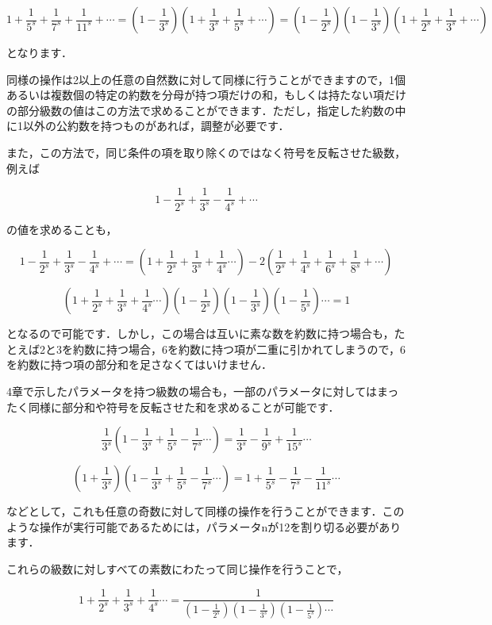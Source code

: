 \documentclass[./main]{subfiles}
\theoremstyle{break}
\begin{document}
\[1+\frac{1}{5^s}+\frac{1}{7^s}+\frac{1}{11^s}+\cdots=\left( 1-\frac{1}{3^s} \right)\left( 1+\frac{1}{3^s}+\frac{1}{5^s}+\cdots \right)=\left( 1-\frac{1}{2^s} \right)\left( 1-\frac{1}{3^s} \right)\left( 1+\frac{1}{2^s}+\frac{1}{3^s}+\cdots \right)\]

となります．

同様の操作は2以上の任意の自然数に対して同様に行うことができますので，1個あるいは複数個の特定の約数を分母が持つ項だけの和，もしくは持たない項だけの部分級数の値はこの方法で求めることができます．ただし，指定した約数の中に1以外の公約数を持つものがあれば，調整が必要です．

また，この方法で，同じ条件の項を取り除くのではなく符号を反転させた級数，例えば

\[1-\frac{1}{2^s}+\frac{1}{3^s}-\frac{1}{4^s}+\cdots\]

の値を求めることも，

\[1-\frac{1}{2^s}+\frac{1}{3^s}-\frac{1}{4^s}+\cdots= \left(1+\frac{1}{2^s}+\frac{1}{3^s}+\frac{1}{4^s}\cdots \right)-2\left(\frac{1}{2^s}+\frac{1}{4^s}+\frac{1}{6^s}+\frac{1}{8^s}+\cdots \right)\]

\[\left( 1+\frac{1}{2^s}+\frac{1}{3^s}+\frac{1}{4^s}\cdots \right)\left( 1-\frac{1}{2^s} \right)\left( 1-\frac{1}{3^s} \right)\left( 1-\frac{1}{5^s} \right)\cdots=1\]

となるので可能です．しかし，この場合は互いに素な数を約数に持つ場合も，たとえば2と3を約数に持つ場合，6を約数に持つ項が二重に引かれてしまうので，6を約数に持つ項の部分和を足さなくてはいけません．

4章で示したパラメータを持つ級数の場合も，一部のパラメータに対してはまったく同様に部分和や符号を反転させた和を求めることが可能です．

\[\frac{1}{3^s}\left(1-\frac{1}{3^s}+\frac{1}{5^s}-\frac{1}{7^s}\cdots\right)=\frac{1}{3^s}-\frac{1}{9^s}+\frac{1}{15^s}\cdots\]

\[\left( 1+\frac{1}{3^s} \right)\left( 1-\frac{1}{3^s}+\frac{1}{5^s}-\frac{1}{7^s}\cdots \right)=1+\frac{1}{5^s}-\frac{1}{7^s}-\frac{1}{11^s}\cdots\]

などとして，これも任意の奇数に対して同様の操作を行うことができます．このような操作が実行可能であるためには，パラメータnが12を割り切る必要があります．

これらの級数に対しすべての素数にわたって同じ操作を行うことで，

\[1+\frac{1}{2^s}+\frac{1}{3^s}+\frac{1}{4^s}\cdots =\frac{1}{\left( 1-\frac{1}{2^s} \right)\left( 1-\frac{1}{3^s} \right)\left( 1-\frac{1}{5^s} \right)\cdots}\]
\end{document}
